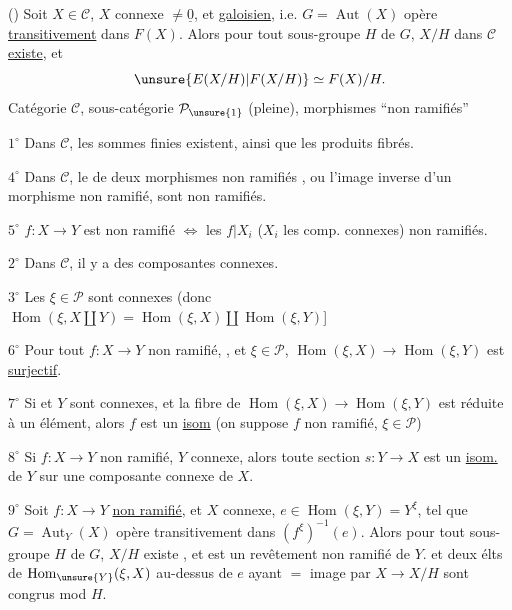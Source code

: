 () Soit $X\in\mathcal C$, $X$ connexe $\ne\underline0$, et \uline{galoisien},  i.e.  $G=\operatorname{Aut}(X)$ opère \uline{transitivement} dans $F(X)$.
Alors pour tout sous-groupe $H$ de $G$, $X/H$ dans $\mathcal C$ \uline{existe}, et
\[
\unsure{E(X/H)|F(X/H)}\simeq F(X)/H.
\]
Catégorie $\mathcal C$, sous-catégorie $\mathcal P_{\unsure{1}}$ (pleine), morphismes ``non ramifiés''

\uline{$1^\circ$} Dans $\mathcal C$, les sommes finies existent, ainsi que les produits fibrés.

\uline{$4^\circ$} Dans $\mathcal C$, le  de deux morphismes non ramifiés , ou l'image inverse d'un morphisme non ramifié, sont non ramifiés.

\uline{$5^\circ$}  $f:X\to Y$ est non ramifié $\Longleftrightarrow$ les $f|X_i$ ($X_i$ les comp. connexes)  non ramifiés.

\uline{$2^\circ$} Dans $\mathcal C$, il y a des composantes connexes.

\uline{$3^\circ$} Les  $\xi\in\mathcal P$ sont connexes
(donc $\operatorname{Hom}(\xi,X\amalg Y)=\operatorname{Hom}(\xi,X)\amalg\operatorname{Hom}(\xi,Y)$]

\uline{$6^\circ$} Pour tout $f:X\to Y$ non ramifié, , et $\xi\in\mathcal P$,
$\operatorname{Hom}(\xi,X)\to\operatorname{Hom}(\xi,Y)$ est \uline{surjectif}.

\uline{$7^\circ$} Si  et $Y$ sont connexes, et la fibre de
$\operatorname{Hom}(\xi,X)\to\operatorname{Hom}(\xi,Y)$ est réduite à un élément, alors $f$ est un \uline{isom}
(on suppose $f$ non ramifié, $\xi\in\mathcal P$)

\uline{$8^\circ$} Si $f:X\to Y$ non ramifié, $Y$ connexe, alors  toute  section $s:Y\to X$ est un \uline{isom.} de $Y$ sur une composante connexe de $X$.

\uline{$9^\circ$} Soit 
$f:X\to Y$ \uline{non ramifié}, et $X$ connexe, \unsure{$\xi\in$} $e\in\operatorname{Hom}(\xi,Y)=Y^\xi$, tel que $G=\operatorname{Aut}_Y(X)$ opère transitivement dans $(f^\xi)^{-1}(e)$.
Alors pour tout sous-groupe $H$ de $G$, $X/H$ existe , et est un revêtement non ramifié de $Y$.
et deux élts de $\operatorname{Hom}_{\unsure{Y}}(\xi,X)$ au-dessus de $e$ ayant $=$ image par $X\to X/H$ sont congrus mod $H$.

